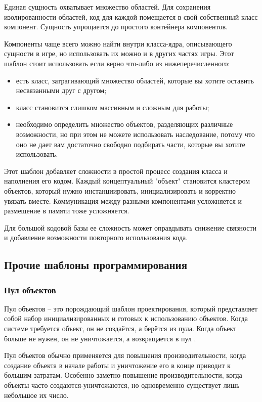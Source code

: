 Единая сущность охватывает множество областей. Для сохранения изолированности областей, код для каждой помещается в свой собственный класс компонент. Сущность упрощается до простого контейнера компонентов.

Компоненты чаще всего можно найти внутри класса-ядра, описывающего сущности в игре, но использовать их можно и в других частях игры. Этот шаблон стоит использовать если верно что-либо из нижеперечисленного:
\begin{itemize}
    \item есть класс, затрагивающий множество областей, которые вы хотите оставить несвязанными друг с другом;
    \item класс становится слишком массивным и сложным для работы;
    \item необходимо определить множество объектов, разделяющих различные возможности, но при этом не можете использовать наследование, потому что оно не дает вам достаточно свободно подбирать части, которые вы хотите использовать.
\end{itemize}

Этот шаблон добавляет сложности в простой процесс создания класса и наполнения его кодом. Каждый концептуальный "объект" становится кластером объектов, который нужно инстанциировать, инициализировать и корректно увязать вместе. Коммуникация между разными компонентами усложняется и размещение в памяти тоже усложняется.

Для большой кодовой базы ее сложность может оправдывать снижение связности и добавление возможности повторного использования кода.


\subsection{Прочие шаблоны программирования}


\subsubsection{Пул объектов}

Пул объектов -- это порождающий шаблон проектирования, который представляет собой набор инициализированных и готовых к использованию объектов. Когда системе требуется объект, он не создаётся, а берётся из пула. Когда объект больше не нужен, он не уничтожается, а возвращается в пул \cite{ProgrammingPatterns}.

Пул объектов обычно применяется для повышения производительности, когда создание объекта в начале работы и уничтожение его в конце приводит к большим затратам. Особенно заметно повышение производительности, когда объекты часто создаются-уничтожаются, но одновременно существует лишь небольшое их число.

